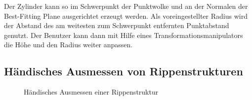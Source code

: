 Der Zylinder kann so im Schwerpunkt der Punktwolke und an der Normalen der Best-Fitting Plane ausgerichtet erzeugt werden. Als voreingestellter Radius wird der Abstand des am weitesten zum Schwerpunkt entfernten Punktabstand genutzt.
Der Benutzer kann dann mit Hilfe eines Transformationsmanipulators die Höhe und den Radius weiter anpassen.







\subsection{H\"andisches Ausmessen von Rippenstrukturen}
\label{ribMeasure}

\begin{figure}[ht]
    \centering 
\caption{H\"andisches Ausmessen einer Rippenstruktur} 
\label{im:domes}
\end{figure} 